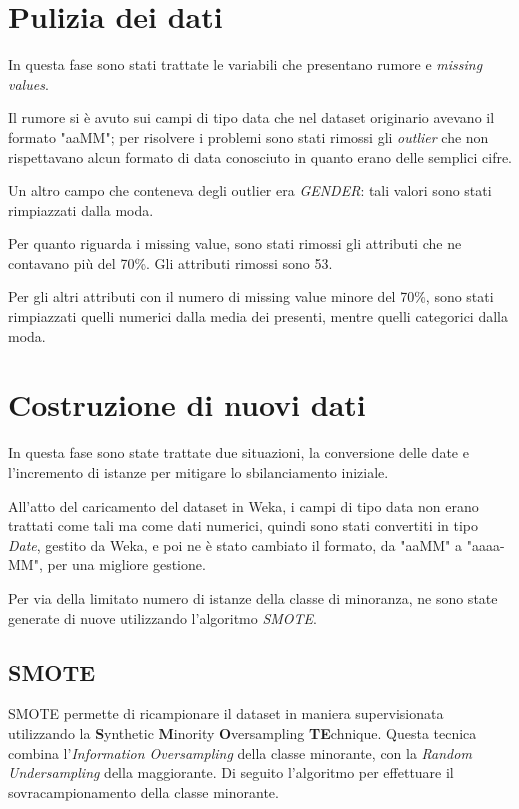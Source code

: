 \section{Pulizia dei dati}
In questa fase sono stati trattate le variabili che presentano rumore e \emph{missing values}.

Il rumore si è avuto sui campi di tipo data che nel dataset originario avevano il formato "aaMM"; per risolvere i problemi sono stati rimossi gli \textit{outlier} che non rispettavano alcun formato di data conosciuto in quanto erano delle semplici cifre.

Un altro campo che conteneva degli outlier era \textit{GENDER}: tali valori sono stati rimpiazzati dalla moda.

Per quanto riguarda i missing value, sono stati rimossi gli attributi che ne contavano più del 70\%. Gli attributi rimossi sono 53.

Per gli altri attributi con il numero di missing value minore del 70\%, sono stati rimpiazzati quelli numerici dalla media dei presenti, mentre quelli categorici dalla moda.

\section{Costruzione di nuovi dati}
\label{sec:construct}
In questa fase sono state trattate due situazioni, la conversione delle date e l'incremento di istanze per mitigare lo sbilanciamento iniziale.

All'atto del caricamento del dataset in Weka, i campi di tipo data non erano trattati come tali ma come dati numerici, quindi sono stati convertiti in tipo \textit{Date}, gestito da Weka, e poi ne è stato cambiato il formato, da "aaMM" a "aaaa-MM", per una migliore gestione.

Per via della limitato numero di istanze della classe di minoranza, ne sono state generate di nuove utilizzando l'algoritmo \textit{SMOTE}.
\subsection{SMOTE}
\label{SMOTE}
SMOTE permette di ricampionare il dataset in maniera supervisionata utilizzando la \textbf{S}ynthetic \textbf{M}inority \textbf{O}versampling \textbf{TE}chnique\cite{Chawla02smote:synthetic}. Questa tecnica combina l'\emph{Information Oversampling} della classe minorante, con la \emph{Random Undersampling} della maggiorante. Di seguito l'algoritmo per effettuare il sovracampionamento della classe minorante.

